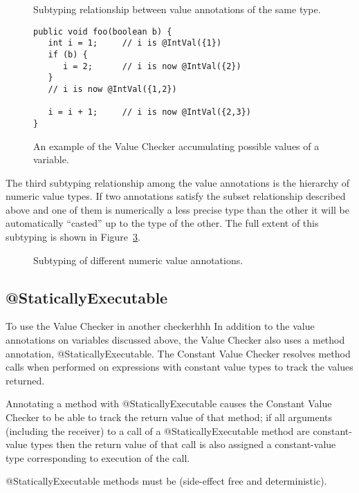\begin{figure}
\caption{Subtyping relationship between value annotations of the same type.}
\label{fig-value-subtype}
\end{figure}

\begin{figure}
\begin{Verbatim}
public void foo(boolean b) {
   int i = 1;     // i is @IntVal({1})
   if (b) {  
      i = 2;      // i is now @IntVal({2})
   }        
   // i is now @IntVal({1,2})
   
   i = i + 1;     // i is now @IntVal({2,3})
}
\end{Verbatim}
\caption{An example of the Value Checker accumulating possible values
    of a variable.}
\label{fig-value-multivalue}
\end{figure}

The third subtyping relationship among the value annotations is the
hierarchy of numeric value types. If two annotations satisfy the
subset relationship described above and one of them is numerically a
less precise type than the other it will be automatically ``casted''
up to the type of the other. The full extent of this subtyping is
shown in Figure~\ref{fig-value-subtyping}.

\begin{figure}
\caption{Subtyping of different numeric value annotations.}
\label{fig-value-subtyping}
\end{figure}

\subsection{@StaticallyExecutable}
To use the Value Checker in another checkerhhh
In addition to the value annotations on variables discussed above, the
Value Checker also uses a method annotation,
@StaticallyExecutable. The Constant Value Checker resolves method
calls when performed on expressions with constant value types to track
the values returned.

Annotating a method with @StaticallyExecutable causes the Constant
Value Checker to be able to track the return value of that method; if
all arguments (including the receiver) to a call of a
@StaticallyExecutable method are constant-value types then the return
value of that call is also assigned a constant-value type
corresponding to execution of the call.

@StaticallyExecutable methods must
be  (side-effect free and
deterministic).

